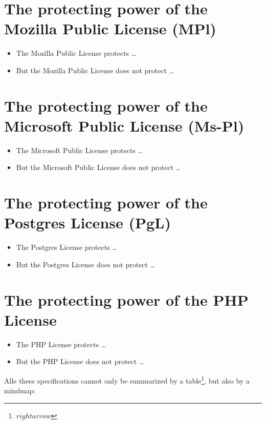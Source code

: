 \section{The protecting power of the Mozilla Public License (MPl)}
\begin{itemize} 
  \item The Mozilla Public License protects \ldots
  \item But the Mozilla Public License does not protect \ldots
\end{itemize}

\section{The protecting power of the Microsoft Public License (Ms-Pl)}
\begin{itemize} 
  \item The Microsoft Public License protects \ldots
  \item But the Microsoft Public License does not protect \ldots
\end{itemize}

\section{The protecting power of the Postgres License (PgL)}
\begin{itemize} 
  \item The Postgres License protects \ldots
  \item But the Postgres License does not protect \ldots
\end{itemize}

\section{The protecting power of the PHP License}
\begin{itemize} 
  \item The PHP License protects \ldots
  \item But the PHP License does not protect \ldots
\end{itemize}  

Alle these specifications cannot only be summarized by a
table\footnote{$rightarrow$ \pageref{tab:powerOfLicenses}}, but also by a
mindmap:

